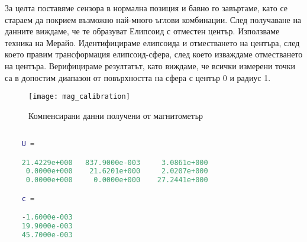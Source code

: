 За целта поставяме сензора в нормална позиция и бавно го завъртаме, като се стараем да покрием възможно най-много ъглови комбинации.
След получаване на данните виждаме, че те образуват Елипсоид с отместен център.
Използваме техника на Мерайо.
Идентифицираме елипсоида и отместването на центъра,
след което правим трансформация елипсоид-сфера,
след което изваждаме отместването на центъра.
Верифицираме резултатът, като виждаме, че всички измерени точки са в допостим диапазон от повърхността на сфера с център 0 и радиус 1.

\begin{figure}[htpb!]
    \centering
    \texttt{[image: mag\_calibration]}
    \caption{Компенсирани данни получени от магнитометър}
    \label{fig:mag_calibration}
\end{figure}

\begin{lstlisting}[language=matlab, caption={Получени трансформация елипсоид-сфера и отместване на център}, label={lst:mag_cal_trans}]

    U =

    21.4229e+000   837.9000e-003     3.0861e+000
     0.0000e+000    21.6201e+000     2.0207e+000
     0.0000e+000     0.0000e+000    27.2441e+000

    c =

    -1.6000e-003
    19.9000e-003
    45.7000e-003

\end{lstlisting}



\FloatBarrier


